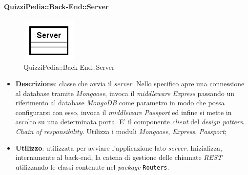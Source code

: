 	\paragraph{QuizziPedia::Back-End::Server}
\label{QuizziPedia::Back-End::Server}
\begin{figure}[ht]
	\centering
	\includegraphics[scale=0.8]{UML/Classi/Back-End/QuizziPedia_Back-End_Server.png}
	\caption{QuizziPedia::Back-End::Server}
\end{figure}
\FloatBarrier
	\begin{itemize}
		\item \textbf{Descrizione}:
		classe che avvia il \textit{server}. Nello specifico apre una connessione al database tramite \textit{Mongoose}, invoca il \textit{middleware} \textit{Express} passando un riferimento al database \textit{MongoDB} come parametro in modo  che possa configurarsi con esso, invoca il \textit{middleware} \textit{Passport} ed infine si mette in ascolto su una determinata porta. E' il componente \textit{client} del \textit{design pattern} \textit{Chain of responsibility}. Utilizza i moduli \textit{Mongoose}, \textit{Express}, \textit{Passport};
		\item \textbf{Utilizzo}:
		utilizzata per avviare l'applicazione lato \textit{server}. Inizializza, internamente al back-end, la catena di gestione delle chiamate \textit{REST} utilizzando le classi contenute nel \textit{package} \texttt{Routers}.
	\end{itemize}
	